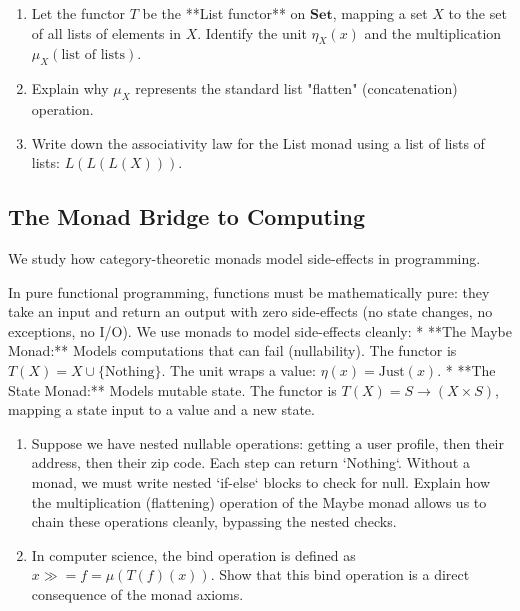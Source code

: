 \documentclass[12pt, a4paper]{article}
\begin{document}
\begin{enumerate}[label=(\alph*), leftmargin=*]
  \item Let the functor $T$ be the **List functor** on $\mathbf{Set}$, mapping a set $X$ to the set of all lists of elements in $X$.
        Identify the unit $\eta_X(x)$ and the multiplication $\mu_X(\text{list of lists})$.
  \item Explain why $\mu_X$ represents the standard list "flatten" (concatenation) operation.
  \item Write down the associativity law for the List monad using a list of lists of lists: $L(L(L(X)))$.
\end{enumerate}

\subsection{The Monad Bridge to Computing}

We study how category-theoretic monads model side-effects in programming.

\begin{explobox}
In pure functional programming, functions must be mathematically pure: they take an input and return an output with zero side-effects (no state changes, no exceptions, no I/O).
\problem We use monads to model side-effects cleanly:
* **The Maybe Monad:** Models computations that can fail (nullability). The functor is $T(X) = X \cup \{\text{Nothing}\}$. The unit wraps a value: $\eta(x) = \text{Just}(x)$.
* **The State Monad:** Models mutable state. The functor is $T(X) = S \to (X \times S)$, mapping a state input to a value and a new state.
\begin{enumerate}[label=(\alph*), leftmargin=*]
  \item Suppose we have nested nullable operations: getting a user profile, then their address, then their zip code. Each step can return `Nothing`.
        Without a monad, we must write nested `if-else` blocks to check for null.
        Explain how the multiplication (flattening) operation of the Maybe monad allows us to chain these operations cleanly, bypassing the nested checks.
  \item In computer science, the bind operation is defined as $x \gg= f = \mu(T(f)(x))$.
        Show that this bind operation is a direct consequence of the monad axioms.
\end{enumerate}
\end{explobox}

\newpage
\end{document}
